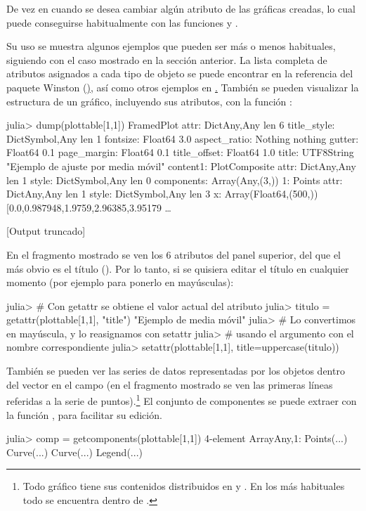 ﻿\documentclass[spanish]{article}
\begin{document}
De vez en cuando se desea cambiar algún atributo de las gráficas creadas,
lo cual puede conseguirse habitualmente con las funciones 
y .

Su uso se muestra algunos ejemplos que pueden ser más o menos habituales,
siguiendo con el caso mostrado en la sección anterior. La lista completa
de atributos asignados a cada tipo de objeto se puede encontrar en la
referencia del paquete Winston (\href{https://github.com/nolta/Winston.jl/wiki/Reference}),
así como otros ejemplos en \href{http://winston.readthedocs.org/}.
También se pueden visualizar la estructura de un gráfico, incluyendo sus
atributos, con la función :

julia> dump(plottable[1,1])
FramedPlot 
  attr: Dict{Any,Any} len 6
    title_style: Dict{Symbol,Any} len 1
      fontsize: Float64 3.0
    aspect_ratio: Nothing nothing
    gutter: Float64 0.1
    page_margin: Float64 0.1
    title_offset: Float64 1.0
    title: UTF8String "Ejemplo de ajuste por media móvil"
  content1: PlotComposite 
    attr: Dict{Any,Any} len 1
      style: Dict{Symbol,Any} len 0
    components: Array(Any,(3,))
      1: Points 
        attr: Dict{Any,Any} len 1
          style: Dict{Symbol,Any} len 3
        x: Array(Float64,(500,)) [0.0,0.987948,1.9759,2.96385,3.95179 …  

[Output truncado]

En el fragmento mostrado se ven los 6 atributos del panel superior,
del que el más obvio es el título ().
Por lo tanto, si se quisiera editar el título en cualquier
momento (por ejemplo para ponerlo en mayúsculas):

julia> # Con getattr se obtiene el valor actual del atributo
julia> titulo = getattr(plottable[1,1], "title")
"Ejemplo de media móvil"
julia> # Lo convertimos en mayúscula, y lo reasignamos con setattr
julia> # usando el argumento con el nombre correspondiente
julia> setattr(plottable[1,1], title=uppercase(titulo))

También se pueden ver las series de datos representadas por los objetos
dentro del vector  en el campo  (en el
fragmento mostrado se ven las primeras líneas referidas a la serie de puntos).\footnote{%
Todo gráfico tiene sus contenidos distribuidos en  y
. En los más habituales todo se encuentra dentro de
.}%
El conjunto de componentes se puede extraer con la función ,
para facilitar su edición.

julia> comp = getcomponents(plottable[1,1])
4-element Array{Any,1}:
 Points(...)
 Curve(...) 
 Curve(...) 
 Legend(...)
\end{document}
